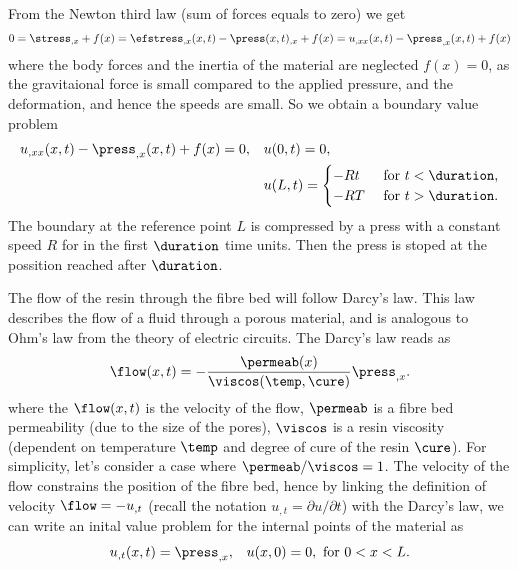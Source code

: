 \documentclass[twoside,a4paper,12pt]{article}
\begin{document}
From the Newton third law (sum of forces equals to zero) we get
%
\begin{align}
  0 =
  \stress_{,x} + f(x) =
  \efstress_{,x}(x,t) - \press(x,t)_{,x} + f(x) =
  u_{,xx}(x,t) - \press_{,x}(x,t) + f(x) 
\end{align}
%
where the body forces and the inertia of the material are neglected
$f(x) = 0$, as the gravitaional force is small compared to the applied
pressure, and the deformation, and hence the speeds are small.
%
So we obtain a boundary value problem
%
\begin{align}
  u_{,xx}(x,t) - \press_{,x}(x,t) + f(x) \label{eq:bvp-flow}
  = 0 , &&& u(0,t) = 0,\\\nonumber
        &&&u(L,t) =
            \begin{cases}
              -Rt &\text{ for } t < \duration,\\
              -RT &\text{ for } t > \duration.
            \end{cases} 
\end{align}
%
The boundary at the reference point $L$ is compressed by a press with
a constant speed $R$ for in the first $\duration$ time units. Then the press
is stoped at the possition reached after $\duration$.

%

The flow of the resin through the fibre bed will follow Darcy's law.
This law describes the flow of a fluid through a porous material, and
is analogous to Ohm's law from the theory of electric circuits. The
Darcy's law reads as
%
\begin{align}
  \flow(x,t) = -\frac{\permeab(x)}{\viscos(\temp,\cure)} \press_{,x}. \label{eq:darcy}
\end{align}
where the $\flow(x,t)$ is the velocity of the flow, $\permeab$ is a fibre bed
permeability (due to the size of the pores),
%
%
$\viscos$ is a resin viscosity (dependent on temperature $\temp$ and
degree of cure of the resin $\cure$).  For simplicity, let's consider
a case where $\permeab/\viscos=1$.
%
The velocity of the flow constrains the position of the fibre bed,
hence by linking the definition of velocity $\flow = - u_{,t}$ (recall the
notation $u_{,t} = \partial u/\partial t$) with the Darcy's law, we
can write an inital value problem for the internal points of the
material as
%
\begin{align}
  u_{,t}(x,t) =  \press_{,x} , && u(x,0) = 0 , \text{ for } 0 < x < L. \label{eq:velocity}
\end{align}
\end{document}
